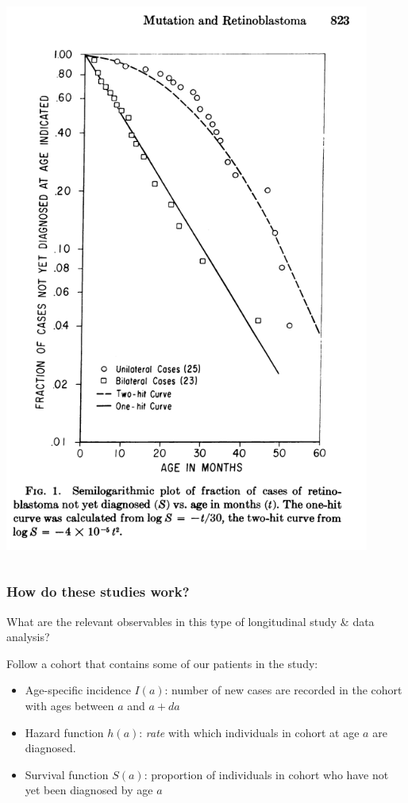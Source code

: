 \documentclass{beamer}
\begin{document}
\begin{frame}
\begin{columns}
\begin{column}{0.5\textwidth}
            \includegraphics[width=0.90\textwidth]{figures/Screenshot_2022-10-31_11-57-01.png}
        \end{column}
    \end{columns}

\end{frame}


\begin{frame}
    \frametitle{How do these studies work?}

    What are the relevant observables in this type of longitudinal study \& data
    analysis? 

    Follow a cohort that contains some of our patients in the study:

    \begin{itemize}
        \item Age-specific incidence $I(a)$: number of new cases are
        recorded in the cohort with ages between $a$ and $a + da$
        \item Hazard function $h(a)$: \emph{rate} with which individuals in
        cohort at age $a$ are diagnosed.
        \item Survival function $S(a)$: proportion of individuals in cohort who
        have not yet been diagnosed by age $a$
    \end{itemize}
\end{frame}
\end{document}
